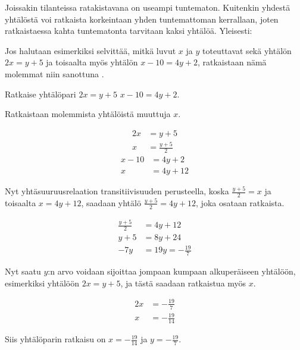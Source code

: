 
Joissakin tilanteissa ratakistavana on useampi tuntematon. Kuitenkin yhdestä yhtälöstä voi ratkaista korkeintaan yhden tuntemattoman kerrallaan, joten ratkaistaessa kahta tuntematonta tarvitaan kaksi yhtälöä. Yleisesti:


Jos halutaan esimerkiksi selvittää, mitkä luvut $x$ ja $y$ toteuttavat sekä yhtälön $2x=y+5$ ja toisaalta 
myös yhtälön $x-10=4y+2$, ratkaistaan nämä molemmat niin sanottuna .

\begin{esimerkki}
	Ratkaise yhtälöpari $2x=y+5$ $x-10=4y+2$.
	
	Ratkaistaan molemmista yhtälöistä muuttuja $x$. 
	
	\begin{align*}
	    2x &= y+5 \\
	    x &= \frac{y+5}{2}
	\end{align*}
	\begin{align*}
	    x-10 &= 4y+2 \\
	    x &= 4y+12
	\end{align*}
	
Nyt yhtäsuuruusrelaation transitiivisuuden perusteella, koska $\frac{y+5}{2}=x$ ja toisaalta $x=4y+12$, saadaan yhtälö $\frac{y+5}{2}=4y+12$, joka osataan ratkaista.

\begin{align*}
	\frac{y+5}{2} &= 4y+12 \\
	y+5 &= 8y+24 \\
	-7y &= 19
	y=-\frac{19}{7}
\end{align*}

Nyt saatu $y$:n arvo voidaan sijoittaa jompaan kumpaan alkuperäiseen yhtälöön, esimerkiksi yhtälöön $2x=y+5$, ja tästä saadaan ratkaistua myös $x$.

\begin{align*}
      2x &= -\frac{19}{7} \\
      x &= -\frac{19}{14}
\end{align*}

Siis yhtälöparin ratkaisu on $x=-\frac{19}{14}$ ja $y=-\frac{19}{7}$.
\end{esimerkki}
